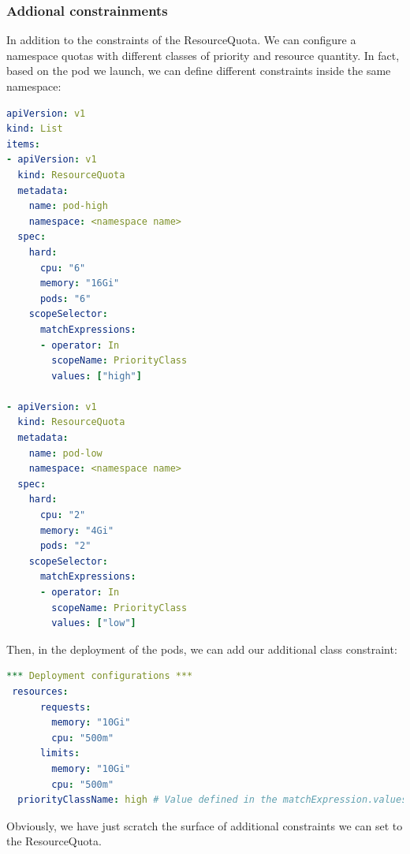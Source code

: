 \subsubsection{Addional constrainments}
In addition to the constraints of the ResourceQuota. We can configure a namespace quotas with different classes of priority and resource quantity. In fact, based on the pod we launch, we can define different constraints inside the same namespace:
\begin{lstlisting}[language=yaml, caption={Class ResourceQuota setup}]
apiVersion: v1
kind: List
items:
- apiVersion: v1
  kind: ResourceQuota
  metadata:
    name: pod-high
    namespace: <namespace name>
  spec:
    hard:
      cpu: "6"
      memory: "16Gi"
      pods: "6"
    scopeSelector:
      matchExpressions:
      - operator: In
        scopeName: PriorityClass
        values: ["high"]

- apiVersion: v1
  kind: ResourceQuota
  metadata:
    name: pod-low
    namespace: <namespace name>
  spec:
    hard:
      cpu: "2"
      memory: "4Gi"
      pods: "2"
    scopeSelector:
      matchExpressions:
      - operator: In
        scopeName: PriorityClass
        values: ["low"]
\end{lstlisting}
Then, in the deployment of the pods, we can add our additional class constraint:
\begin{lstlisting}[language=yaml, caption={Set class - deployment}]
 *** Deployment configurations ***
 resources:
      requests:
        memory: "10Gi"
        cpu: "500m"
      limits:
        memory: "10Gi"
        cpu: "500m"
  priorityClassName: high # Value defined in the matchExpression.values
\end{lstlisting}
Obviously, we have just scratch the surface of additional constraints we can set to the ResourceQuota.

